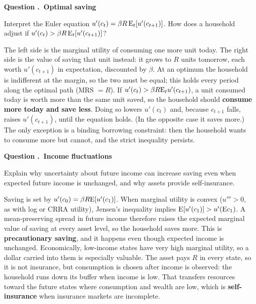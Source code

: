 \documentclass[11pt]{article}
\newcounter{qn}
\newcommand{\question}[1]{\refstepcounter{qn}\par\medskip
{\bfseries\color{ink}Question \theqn.\ #1}\par\smallskip}
\begin{document}
\question{Optimal saving}
Interpret the Euler equation $u'(c_t)=\beta R\,\mathrm{E}_t[u'(c_{t+1})]$. How does a household adjust if $u'(c_t)>\beta R\,\mathrm{E}_t[u'(c_{t+1})]$?

\begin{answer}
The left side is the marginal utility of consuming one more unit today. The right side is the value of saving that unit instead: it grows to $R$ units tomorrow, each worth $u'(c_{t+1})$ in expectation, discounted by $\beta$. At an optimum the household is indifferent at the margin, so the two must be equal; this holds every period along the optimal path (MRS $=R$). If $u'(c_t)>\beta R\mathrm{E}_tu'(c_{t+1})$, a unit consumed today is worth more than the same unit saved, so the household should \textbf{consume more today and save less}. Doing so lowers $u'(c_t)$ and, because $c_{t+1}$ falls, raises $u'(c_{t+1})$, until the equation holds. (In the opposite case it saves more.) The only exception is a binding borrowing constraint: then the household wants to consume more but cannot, and the strict inequality persists.
\end{answer}

\question{Income fluctuations}
Explain why uncertainty about future income can increase saving even when expected future income is unchanged, and why assets provide self-insurance.

\begin{answer}
\begin{minipage}[t]{0.56\textwidth}\vspace{0pt}
Saving is set by $u'(c_0)=\beta R\mathrm{E}[u'(c_1)]$. When marginal utility is convex ($u'''>0$, as with log or CRRA utility), Jensen's inequality implies $\mathrm{E}[u'(c_1)]>u'(\mathrm{E} c_1)$. A mean-preserving spread in future income therefore raises the expected marginal value of saving at every asset level, so the household saves more. This is \textbf{precautionary saving}, and it happens even though expected income is unchanged. Economically, low-income states have very high marginal utility, so a dollar carried into them is especially valuable. The asset pays $R$ in every state, so it is not insurance, but consumption is chosen after income is observed: the household runs down its buffer when income is low. That transfers resources toward the future states where consumption and wealth are low, which is \textbf{self-insurance} when insurance markets are incomplete.
\end{minipage}\hfill
\begin{minipage}[t]{0.4\textwidth}\vspace{0pt}\centering
\figPrecaution
\end{minipage}
\end{answer}
\end{document}
